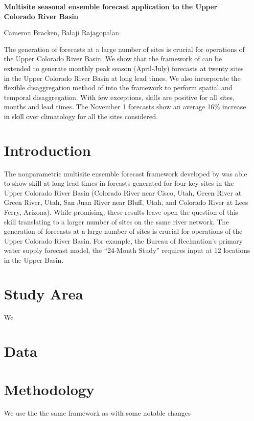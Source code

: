 \documentclass[11pt,twoside]{article}
\begin{document}
\textbf{\Large Multisite seasonal ensemble forecast application to the Upper Colorado River Basin}

Cameron Bracken, Balaji Rajagopalan


 \doublespacing 
 \linenumbers
{\flushleft\small

The generation of forecasts at a large number of sites is crucial for operations of the Upper Colorado River Basin.  We show that the framework of \cite{Bracken:2010p2682} can be extended to generate monthly peak season (April-July) forecasts at twenty sites in the Upper Colorado River Basin at long lead times.     We also incorporate the flexible disaggregation method of \cite{Nowak:2010p2738} into the framework to perform spatial and temporal disaggregation.  With few exceptions, skills are positive for all sites, months and lead times.  The November 1 forecasts show an average 16\% increase in skill over climatology for all the sites considered. 
}

\section{Introduction}
The nonparametric multisite ensemble forecast framework developed by \cite{Bracken:2010p2682} was able to show skill at long lead times in forcasts generated for four key sites in the Upper Colorado River Basin (Colorado River near Cisco, Utah, Green River at Green River, Utah, San Juan River near Bluff, Utah, and Colorado River at Lees Ferry, Arizona).  While promising, these results leave open the question of this skill translating to a larger number of sites on the same river network. The generation of forecasts at a large number of sites is crucial for operations of the Upper Colorado River Basin.  For example, the Bureau of Reclmation's primary water supply forecast model, the ``24-Month Study'' requires input at 12 locations in the Upper Basin.  



\section{Study Area}
We 

\section{Data}

\section{Methodology}

We use the the same framework as \cite{Bracken:2010p2682} with some notable changes



\end{document}
